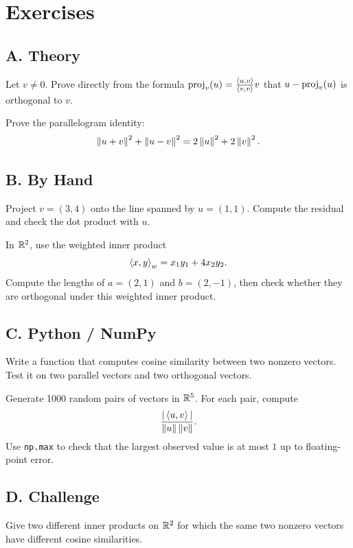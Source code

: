 \section*{Exercises}

\subsection*{A. Theory}

\begin{exercise}
Let $v\neq 0$. Prove directly from the formula
$\operatorname{proj}_v(u)=\frac{\left\langle u,v \right\rangle}{\left\langle v,v \right\rangle}v$ that
$u-\operatorname{proj}_v(u)$ is orthogonal to $v$.
\end{exercise}

\begin{exercise}
Prove the parallelogram identity:
\[
  \left\lVert u+v \right\rVert^2+\left\lVert u-v \right\rVert^2=2\left\lVert u \right\rVert^2+2\left\lVert v \right\rVert^2.
\]
\end{exercise}

\subsection*{B. By Hand}

\begin{exercise}
Project $v=(3,4)$ onto the line spanned by $u=(1,1)$. Compute the residual
and check the dot product with $u$.
\end{exercise}

\begin{exercise}
In $\mathbb{R}^2$, use the weighted inner product
\[
  \left\langle x,y \right\rangle_w=x_1y_1+4x_2y_2.
\]
Compute the lengths of $a=(2,1)$ and $b=(2,-1)$, then check whether they are
orthogonal under this weighted inner product.
\end{exercise}

\subsection*{C. Python / NumPy}

\begin{exercise}
Write a function that computes cosine similarity between two nonzero vectors.
Test it on two parallel vectors and two orthogonal vectors.
\end{exercise}

\begin{exercise}
Generate 1000 random pairs of vectors in $\mathbb{R}^5$. For each pair, compute
\[
  \frac{|\left\langle u,v \right\rangle|}{\left\lVert u \right\rVert\left\lVert v \right\rVert}.
\]
Use \texttt{np.max} to check that the largest observed value is at most $1$
up to floating-point error.
\end{exercise}

\subsection*{D. Challenge}

\begin{exercise}
Give two different inner products on $\mathbb{R}^2$ for which the same two nonzero
vectors have different cosine similarities.
\end{exercise}
